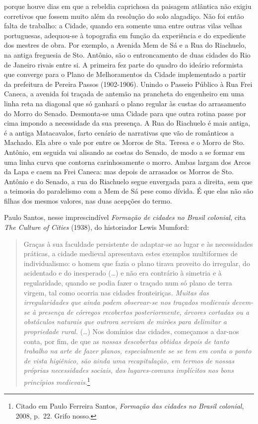 porque houve dias em que a rebeldia caprichosa da paisagem atlântica não
exigiu corretivos que fossem muito além da resolução do solo alagadiço.
Não foi então falta de trabalho: a Cidade, quando era somente uma entre
outras vilas velhas portuguesas, adequou-se à topografia em função da
experiência e do expediente dos mestres de obra. Por exemplo, a Avenida
Mem de Sá e a Rua do Riachuelo, na antiga freguesia de Sto. Antônio, são
o entroncamento de duas cidades do Rio de Janeiro rivais entre si. A
primeira fez parte do quadro do ideário reformista que converge para o
Plano de Melhoramentos da Cidade implementado a partir da prefeitura de
Pereira Passos (1902-1906). Unindo o Passeio Público à Rua Frei Caneca,
a avenida foi traçada de antemão na prancheta do engenheiro em uma linha
reta na diagonal que só ganhará o plano regular às custas do arrasamento
do Morro do Senado. Desmonta-se uma Cidade para que outra rotina passe
por cima impondo a necessidade da sua presença. A Rua do Riachuelo é
mais antiga, é a antiga Matacavalos, farto cenário de narrativas que vão
de românticos a Machado. Ela abre o vale por entre os Morros de Sta.
Teresa e o Morro de Sto. Antônio, em seguida vai alisando as costas do
Senado, de modo a se formar em uma linha curva que contorna
carinhosamente o morro. Ambas largam dos Arcos da Lapa e caem na Frei
Caneca: mas depois de arrasados os Morros de Sto. Antônio e do Senado, a
rua do Riachuelo segue envergada para a direita, sem que a teimosia do
paralelismo com a Mem de Sá pese como dívida. É que elas não são filhas
dos mesmos valores, nas duas acepções do termo.

Paulo Santos, nesse imprescindível \emph{Formação de cidades no Brasil
colonial}, cita \emph{The Culture of Cities} (1938), do historiador
Lewis Mumford:

\begin{quote}
Graças à sua faculdade persistente de adaptar-se ao lugar e às
necessidades práticas, a cidade medieval apresentava estes exemplos
multiformes de individualismo: o homem que fazia o plano tirava proveito
do irregular, do acidentado e do inesperado (\ldots{}) e não era
contrário à simetria e à regularidade, quando se podia fazer o traçado
num só plano de terra virgem, tal como ocorria nas cidades
fronteiriças\emph{. Muitas das irregularidades que ainda podem
observar-se nos traçados medievais devem-se à presença de córregos
recobertos posteriormente, árvores cortadas ou a obstáculos naturais que
outrora serviam de mirões para delimitar a propriedade rural.}
(\ldots{}) Nos domínios das cidades, começamos a dar-nos conta, por fim,
de que as \emph{nossas descobertas obtidas depois de tanto trabalho na
arte de fazer planos, especialmente se se tem em conta o ponto de vista
higiênico, são ainda uma recapitulação, em termos de nossas próprias
necessidades sociais, dos lugares-comuns implícitos nos bons princípios
medievais}.\footnote{Citado em Paulo Ferreira Santos, \emph{Formação das
  cidades no Brasil colonial}, 2008, p.~22. Grifo nosso.}
\end{quote}

